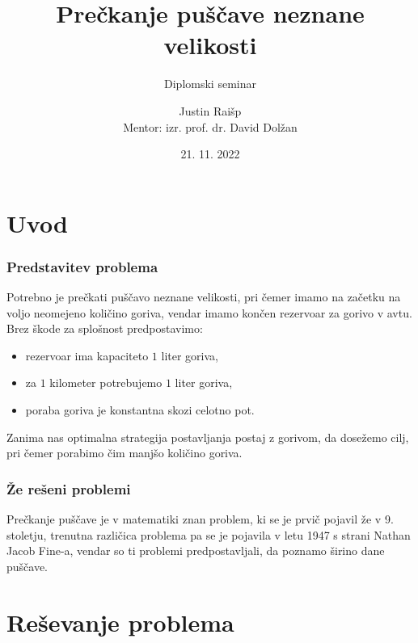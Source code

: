 \documentclass{beamer}
\title{Prečkanje puščave neznane velikosti}
\subtitle{Diplomski seminar}
\author[Justin Raišp]{Justin Raišp \\ \footnotesize Mentor: izr. prof. dr. David Dolžan}
\institute[FMF]{Fakulteta za matematiko in fiziko}
\date{21. 11. 2022}
\begin{document}
\frame{\titlepage}

\section{Uvod}

\begin{frame}
   \frametitle{Predstavitev problema}
    Potrebno je prečkati puščavo neznane velikosti, pri čemer imamo na začetku na voljo neomejeno količino goriva, 
    vendar imamo končen rezervoar za gorivo v avtu. Brez škode za splošnost predpostavimo:
    \begin{itemize}
        \item rezervoar ima kapaciteto $1$ liter goriva,
        \item za $1$ kilometer potrebujemo $1$ liter goriva,
        \item poraba goriva je konstantna skozi celotno pot.
    \end{itemize}
    Zanima nas optimalna strategija postavljanja postaj z gorivom, da dosežemo cilj, pri čemer porabimo čim manjšo količino goriva.
\end{frame}
\begin{frame}
    \frametitle{Že rešeni problemi}
    Prečkanje puščave je v matematiki znan problem, ki se je prvič pojavil že v 9. stoletju, trenutna različica 
    problema pa se je pojavila v letu 1947 s strani Nathan Jacob Fine-a, vendar so ti problemi predpostavljali, da 
    poznamo širino dane puščave.
 \end{frame}
 \section{Reševanje problema} 
\end{document}
